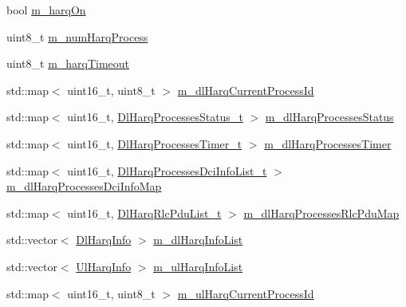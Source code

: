 \begin{DoxyCompactItemize}
\item 
bool \hyperlink{classns3_1_1MmWaveFlexTtiPfMacScheduler_ab7edfa7baaf0e2ce6c2ba43efc59e291}{m\+\_\+harq\+On}
\item 
uint8\+\_\+t \hyperlink{classns3_1_1MmWaveFlexTtiPfMacScheduler_a32f8193ed0cbe519defe7665645190f5}{m\+\_\+num\+Harq\+Process}
\item 
uint8\+\_\+t \hyperlink{classns3_1_1MmWaveFlexTtiPfMacScheduler_a0b6547fb503363af7edc277041014b6d}{m\+\_\+harq\+Timeout}
\item 
std\+::map$<$ uint16\+\_\+t, uint8\+\_\+t $>$ \hyperlink{classns3_1_1MmWaveFlexTtiPfMacScheduler_a89bcae9788b69158ca5c798d629f1887}{m\+\_\+dl\+Harq\+Current\+Process\+Id}
\item 
std\+::map$<$ uint16\+\_\+t, \hyperlink{classns3_1_1MmWaveFlexTtiPfMacScheduler_a75e349f797625294b5bb7cb4d124c3c9}{Dl\+Harq\+Processes\+Status\+\_\+t} $>$ \hyperlink{classns3_1_1MmWaveFlexTtiPfMacScheduler_ac8fbe1bcc35d738ae7944797590909fc}{m\+\_\+dl\+Harq\+Processes\+Status}
\item 
std\+::map$<$ uint16\+\_\+t, \hyperlink{classns3_1_1MmWaveFlexTtiPfMacScheduler_a4f1abd9cba2b6680b64512f202305afb}{Dl\+Harq\+Processes\+Timer\+\_\+t} $>$ \hyperlink{classns3_1_1MmWaveFlexTtiPfMacScheduler_a833b2d085a67e2fcb7403ebe1f4c6f86}{m\+\_\+dl\+Harq\+Processes\+Timer}
\item 
std\+::map$<$ uint16\+\_\+t, \hyperlink{classns3_1_1MmWaveFlexTtiPfMacScheduler_ac9919290b2875ec0f1b50e9443c26d49}{Dl\+Harq\+Processes\+Dci\+Info\+List\+\_\+t} $>$ \hyperlink{classns3_1_1MmWaveFlexTtiPfMacScheduler_a409de362c5e49fc6956b26ee2644db4d}{m\+\_\+dl\+Harq\+Processes\+Dci\+Info\+Map}
\item 
std\+::map$<$ uint16\+\_\+t, \hyperlink{classns3_1_1MmWaveFlexTtiPfMacScheduler_a09920c18040ab1c56ec463c790103858}{Dl\+Harq\+Rlc\+Pdu\+List\+\_\+t} $>$ \hyperlink{classns3_1_1MmWaveFlexTtiPfMacScheduler_a9a0027a79dee0a60f04e55c25efb7ab7}{m\+\_\+dl\+Harq\+Processes\+Rlc\+Pdu\+Map}
\item 
std\+::vector$<$ \hyperlink{structns3_1_1DlHarqInfo}{Dl\+Harq\+Info} $>$ \hyperlink{classns3_1_1MmWaveFlexTtiPfMacScheduler_a71cf056c010c970921c28871ed145af0}{m\+\_\+dl\+Harq\+Info\+List}
\item 
std\+::vector$<$ \hyperlink{structns3_1_1UlHarqInfo}{Ul\+Harq\+Info} $>$ \hyperlink{classns3_1_1MmWaveFlexTtiPfMacScheduler_ad0251a6033c790a29ff25da7426ffd38}{m\+\_\+ul\+Harq\+Info\+List}
\item 
std\+::map$<$ uint16\+\_\+t, uint8\+\_\+t $>$ \hyperlink{classns3_1_1MmWaveFlexTtiPfMacScheduler_a17831f5feb0fb7c56cdaf76e6b1b9638}{m\+\_\+ul\+Harq\+Current\+Process\+Id}

\end{DoxyCompactItemize}
